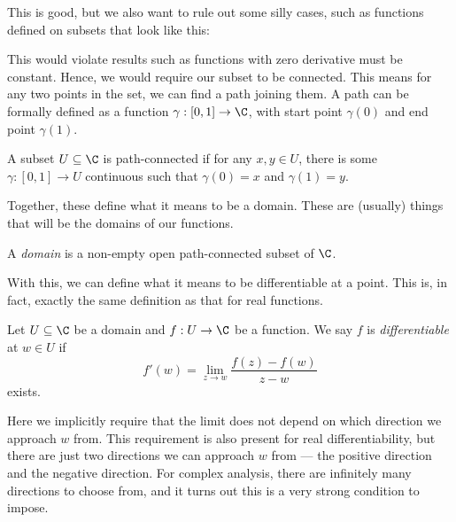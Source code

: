 \documentclass[a4paper]{article}
\begin{document}
This is good, but we also want to rule out some silly cases, such as functions defined on subsets that look like this:
\begin{center}
\end{center}
This would violate results such as functions with zero derivative must be constant. Hence, we would require our subset to be connected. This means for any two points in the set, we can find a path joining them. A path can be formally defined as a function $\gamma: [0, 1] \to \C$, with start point $\gamma(0)$ and end point $\gamma(1)$.

\begin{defi}
  A subset $U \subseteq \C$ is path-connected if for any $x, y \in U$, there is some $\gamma: [0, 1] \to U$ continuous such that $\gamma(0) = x$ and $\gamma(1) = y$.
\end{defi}

Together, these define what it means to be a domain. These are (usually) things that will be the domains of our functions.
\begin{defi}[Domain]
  A \emph{domain} is a non-empty open path-connected subset of $\C$.
\end{defi}

With this, we can define what it means to be differentiable at a point. This is, in fact, exactly the same definition as that for real functions.
\begin{defi}
  Let $U \subseteq \C$ be a domain and $f: U \to \C$ be a function. We say $f$ is \emph{differentiable} at $w \in U$ if
  \[
    f'(w) = \lim_{z\to w} \frac{f(z) - f(w)}{z - w}
  \]
  exists.
\end{defi}
Here we implicitly require that the limit does not depend on which direction we approach $w$ from. This requirement is also present for real differentiability, but there are just two directions we can approach $w$ from --- the positive direction and the negative direction. For complex analysis, there are infinitely many directions to choose from, and it turns out this is a very strong condition to impose.
\end{document}

